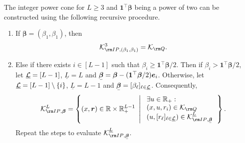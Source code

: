 \documentclass[opre, nonblindrev]{informswp}
\newcommand{\1}[1]{\mathds{1}{\left(#1\right)}}
\begin{document}
\begin{appendices}
\begin{theorem}
\label{thm:IntegerPowerConvert}
The integer power cone for $L\geq 3$ and $\bm 1^\top \bm \beta$ being a power of two can be constructed using the following recursive procedure.
\begin{enumerate}[Step 1.]

\item If  $\bm \beta = (\beta_1, \beta_1)$, then
$$
\cK^{3}_{{\rm IP},(\beta_1,\beta_1)} =   \cK_{
\rm Q}.  
$$

\item Else if there exists $i \in [L-1]$ such that $\beta_i \geq \bm 1^\top \bm \beta/2$. Then if $\beta_i >  \bm 1^\top \bm \beta/2$, let $\underline {\mathcal{L}} = [L-1]$, $\underline L = L$ and $\bmu \beta =\bm \beta - (\bm 1^\top \bm \beta/2)\bm e_i$. Otherwise, let $\underline {\mathcal{L}} = [L-1]\setminus\{i\}$, $\underline L = L-1$ and  $\bmu \beta = [\beta_\ell]_{\ell \in \underline \cL}$. Consequently, 
$$
\cK^{L}_{{\rm IP},\bm \beta} = \left\{ (x,\bm r) \in \bbr\times \bbr^{L-1}_+ ~\left|~ 
\begin{array}{ll} \exists u \in \bbr_+: \\
(x,u,r_i) \in \cK_{{\rm Q}} \\
(u, [r_\ell]_{\ell \in \underline \cL}) \in \cK^{\underline L}_{{\rm IP},\bmu \beta} \\
\end{array}
\right.\right\}.
$$
Repeat the steps to evaluate $\cK^{\underline L}_{{\rm IP},\bmu \beta}$.


\end{enumerate}
\end{theorem}
\end{appendices}
\end{document}
